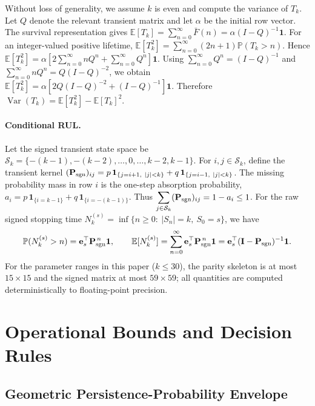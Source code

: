 \documentclass[pdflatex,sn-mathphys-num]{sn-jnl}
\theoremstyle{definition}
\DeclareMathOperator{\Var}{Var}
\newcommand{\Prob}{\mathbb{P}}
\newcommand{\E}{\mathbb{E}}
\numberwithin{equation}{section}
\begin{document}
Without loss of generality, we assume $k$ is even and compute the variance of $T_k$. Let \(Q\) denote the relevant transient matrix and let \(\alpha\) be the initial
row vector. The survival representation gives
$\displaystyle \E[T_k]
=
\sum_{n=0}^{\infty}\bar F(n)
=
\alpha(I-Q)^{-1}\mathbf 1$.
For an integer-valued positive lifetime,
$\displaystyle \E[T_k^2]
=
\sum_{n=0}^{\infty}(2n+1)\Prob(T_k>n)$.
Hence
$\displaystyle \E[T_k^2]
=
\alpha
\left[
2\sum_{n=0}^{\infty}nQ^n
+
\sum_{n=0}^{\infty}Q^n
\right]\mathbf 1$.
Using
$\displaystyle \sum_{n=0}^{\infty}Q^n=(I-Q)^{-1}$ and 
$\displaystyle \sum_{n=0}^{\infty}nQ^n=Q(I-Q)^{-2}$,
we obtain
$\displaystyle \E[T_k^2]
=
\alpha
\left[
2Q(I-Q)^{-2}
+
(I-Q)^{-1}
\right]\mathbf 1$.
Therefore
$\displaystyle \Var(T_k)
=
\E[T_k^2]-\E[T_k]^2$.

\paragraph{Conditional RUL.} 
Let the signed transient state space be
$\displaystyle \mathcal S_k=\{-(k-1),-(k-2),\ldots,0,\ldots,k-2,k-1\}$.
For \(i,j\in\mathcal S_k\), define the transient kernel
$\displaystyle (\mathbf P_{\rm sgn})_{ij}
=
p\,\mathbf 1_{\{j=i+1,\ |j|<k\}}
+
q\,\mathbf 1_{\{j=i-1,\ |j|<k\}}$.
The missing probability mass in row \(i\) is the one-step absorption probability,
$\displaystyle a_i
=
p\,\mathbf 1_{\{i=k-1\}}
+
q\,\mathbf 1_{\{i=-(k-1)\}}$.
Thus
$\displaystyle \sum_{j\in\mathcal S_k}(\mathbf P_{\rm sgn})_{ij}
=
1-a_i
\le 1$.
For the raw signed stopping time
$\displaystyle N_k^{(s)}=\inf\{n\ge 0:\ |S_n|=k,\ S_0=s\}$,
we have
\begin{equation}
\label{eq:RUL}
\Prob(N_k^{(s)}>n)
=
\mathbf e_s^\top \mathbf P_{\rm sgn}^{\,n}\mathbf 1,
\qquad
\E[N_k^{(s)}]
=
\sum_{n=0}^{\infty}\mathbf e_s^\top \mathbf P_{\rm sgn}^{\,n}\mathbf 1
=
\mathbf e_s^\top(\mathbf I-\mathbf P_{\rm sgn})^{-1}\mathbf 1.
\end{equation}
For the parameter ranges in this paper ($k\le 30$), the parity skeleton is at most $15\times 15$ and the signed matrix at most $59\times 59$; all quantities are computed deterministically to floating-point precision.

\section{Operational Bounds and Decision Rules}\label{sec:decisions}

\subsection{Geometric Persistence-Probability Envelope}\label{sec:geo}
\end{document}
